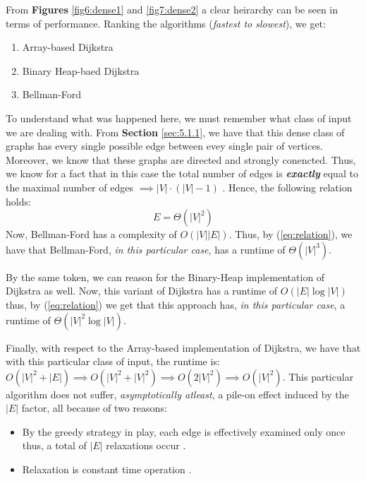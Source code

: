 \documentclass[a4paper, 12pt]{report}
\theoremstyle{definition}
\begin{document}
From \textbf{Figures} \ref{fig6:dense1} and \ref{fig7:dense2} a clear heirarchy can be seen in terms of performance. Ranking the algorithms (\emph{fastest to slowest}), we get:
\begin{enumerate}
  \item Array-based Dijkstra
  \item Binary Heap-baed Dijkstra
  \item Bellman-Ford
\end{enumerate}

To understand what was happened here, we must remember what class of input we are dealing with. From \textbf{Section} \ref{sec:5.1.1}, we have that this dense class of graphs has every single possible edge between evey single pair of vertices. Moreover,
we know that these graphs are directed and strongly conencted. Thus, we know for a fact that in this case the total number of edges is \emph{\textbf{exactly}} equal to the maximal number of edges $\implies |V| \cdot (|V| - 1)$ \cite{cormenBk}. Hence, the following relation holds:
\begin{equation}
  \label{eq:relation}
  E = \Theta(|V|^{2})
\end{equation}
Now, Bellman-Ford has a complexity of $O(|V||E|)$. Thus, by (\ref{eq:relation}), we have that Bellman-Ford, \emph{in this particular case}, has a runtime of $\Theta(|V|^{3})$.

By the same token, we can reason for the Binary-Heap implementation of Dijkstra as well. Now, this variant of Dijkstra has a runtime of \(O(|E| \log |V|)\) thus, by (\ref{eq:relation})
we get that this approach has, \emph{in this particular case}, a runtime of $\Theta(|V|^{2} \log |V|)$. 

Finally, with respect to the Array-based implementation of Dijkstra, we have that with this particular class of input, the runtime is: $O(|V|^{2} + |E|) \implies O(|V|^{2} + |V|^{2}) \implies O(2|V|^{2}) \implies O(|V|^{2})$.
This particular algorithm does not suffer, \emph{asymptotically atleast}, a pile-on effect induced by the \(|E|\) factor, all because of two reasons:
\begin{itemize}
  \item By the greedy strategy in play, each edge is effectively examined only once thus, a total of $|E|$ relaxations occur \cite{cormenBk,ocw:2020,stand:bford:12}.
  \item Relaxation is constant time operation \cite{cormenBk,ocw:2020,stand:bford:12}.
\end{itemize}
\end{document}
